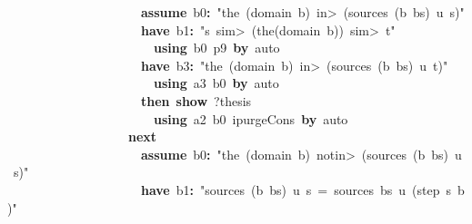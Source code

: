 \documentclass{article}
\newcommand{\syntaxKEYWORDA}[1]{\textcolor[rgb]{0.0,0.4,0.6}{\textbf{#1}}}
\newcommand{\syntaxKEYWORDC}[1]{\textcolor[rgb]{0.0,0.6,1.0}{\textbf{#1}}}
\newcommand{\syntaxLITERALA}[1]{\textcolor[rgb]{1.0,0.0,0.8}{#1}}
\newcommand{\syntaxOPERATOR}[1]{\textcolor[rgb]{0.0,0.0,0.0}{\textbf{#1}}}
\newcommand{\syntaxKEYWORDA}[1]{\textcolor[rgb]{0.0,0.4,0.6}{\textbf{#1}}}
\newcommand{\syntaxKEYWORDC}[1]{\textcolor[rgb]{0.0,0.6,1.0}{\textbf{#1}}}
\newcommand{\syntaxLITERALA}[1]{\textcolor[rgb]{1.0,0.0,0.8}{#1}}
\newcommand{\syntaxOPERATOR}[1]{\textcolor[rgb]{0.0,0.0,0.0}{\textbf{#1}}}
\newcommand{\syntaxKEYWORDA}[1]{\textcolor[rgb]{0.0,0.4,0.6}{\textbf{#1}}}
\newcommand{\syntaxKEYWORDC}[1]{\textcolor[rgb]{0.0,0.6,1.0}{\textbf{#1}}}
\newcommand{\syntaxLITERALA}[1]{\textcolor[rgb]{1.0,0.0,0.8}{#1}}
\newcommand{\syntaxOPERATOR}[1]{\textcolor[rgb]{0.0,0.0,0.0}{\textbf{#1}}}
\newcommand{\syntaxKEYWORDA}[1]{\textcolor[rgb]{0.0,0.4,0.6}{#1}}
\newcommand{\syntaxKEYWORDC}[1]{\textcolor[rgb]{0.0,0.6,1.0}{#1}}
\newcommand{\syntaxLITERALA}[1]{\textcolor[rgb]{1.0,0.0,0.8}{\textbf{#1}}}
\newcommand{\syntaxOPERATOR}[1]{\textcolor[rgb]{0.0,0.0,0.0}{#1}}
\newcommand{\syntaxKEYWORDA}[1]{\textcolor[rgb]{0.0,0.4,0.6}{\textbf{#1}}}
\newcommand{\syntaxKEYWORDC}[1]{\textcolor[rgb]{0.0,0.6,1.0}{\textbf{#1}}}
\newcommand{\syntaxLITERALA}[1]{\textcolor[rgb]{1.0,0.0,0.8}{#1}}
\newcommand{\syntaxOPERATOR}[1]{\textcolor[rgb]{0.0,0.0,0.0}{\textbf{#1}}}
\newcommand{\syntaxKEYWORDA}[1]{\textcolor[rgb]{0.0,0.4,0.6}{\textbf{#1}}}
\newcommand{\syntaxKEYWORDC}[1]{\textcolor[rgb]{0.0,0.6,1.0}{\textbf{#1}}}
\newcommand{\syntaxLITERALA}[1]{\textcolor[rgb]{1.0,0.0,0.8}{#1}}
\newcommand{\syntaxOPERATOR}[1]{\textcolor[rgb]{0.0,0.0,0.0}{\textbf{#1}}}
\begin{document}
{\ }{\ }{\ }{\ }{\ }{\ }{\ }{\ }{\ }{\ }{\ }{\ }{\ }{\ }{\ }{\ }{\ }{\ }{\ }{\ }{\ }\syntaxKEYWORDC{assume}{\ }b0\syntaxOPERATOR{:}{\ }\syntaxLITERALA{"the{\ }(domain{\ }b){\ }\<in>{\ }(sources{\ }(b{\ }\usebox{\hashbox}{\ }bs){\ }u{\ }s)"}\hspace*{\fill}\\
{\ }{\ }{\ }{\ }{\ }{\ }{\ }{\ }{\ }{\ }{\ }{\ }{\ }{\ }{\ }{\ }{\ }{\ }{\ }{\ }{\ }\syntaxKEYWORDA{have}{\ }b1\syntaxOPERATOR{:}{\ }\syntaxLITERALA{"s{\ }\<sim>{\ }(the(domain{\ }b)){\ }\<sim>{\ }t"}\hspace*{\fill}\\
{\ }{\ }{\ }{\ }{\ }{\ }{\ }{\ }{\ }{\ }{\ }{\ }{\ }{\ }{\ }{\ }{\ }{\ }{\ }{\ }{\ }{\ }{\ }\syntaxKEYWORDA{using}{\ }b0{\ }p9{\ }\syntaxKEYWORDA{by}{\ }auto\hspace*{\fill}\\
{\ }{\ }{\ }{\ }{\ }{\ }{\ }{\ }{\ }{\ }{\ }{\ }{\ }{\ }{\ }{\ }{\ }{\ }{\ }{\ }{\ }\syntaxKEYWORDA{have}{\ }b3\syntaxOPERATOR{:}{\ }\syntaxLITERALA{"the{\ }(domain{\ }b){\ }\<in>{\ }(sources{\ }(b{\ }\usebox{\hashbox}{\ }bs){\ }u{\ }t)"}\hspace*{\fill}\\
{\ }{\ }{\ }{\ }{\ }{\ }{\ }{\ }{\ }{\ }{\ }{\ }{\ }{\ }{\ }{\ }{\ }{\ }{\ }{\ }{\ }{\ }{\ }\syntaxKEYWORDA{using}{\ }a3{\ }b0{\ }\syntaxKEYWORDA{by}{\ }auto\hspace*{\fill}\\
{\ }{\ }{\ }{\ }{\ }{\ }{\ }{\ }{\ }{\ }{\ }{\ }{\ }{\ }{\ }{\ }{\ }{\ }{\ }{\ }{\ }\syntaxKEYWORDA{then}{\ }\syntaxKEYWORDC{show}{\ }?thesis\hspace*{\fill}\\
{\ }{\ }{\ }{\ }{\ }{\ }{\ }{\ }{\ }{\ }{\ }{\ }{\ }{\ }{\ }{\ }{\ }{\ }{\ }{\ }{\ }{\ }{\ }\syntaxKEYWORDA{using}{\ }a2{\ }b0{\ }ipurge\usebox{\underscorebox}Cons{\ }\syntaxKEYWORDA{by}{\ }auto\hspace*{\fill}\\
{\ }{\ }{\ }{\ }{\ }{\ }{\ }{\ }{\ }{\ }{\ }{\ }{\ }{\ }{\ }{\ }{\ }{\ }{\ }\syntaxKEYWORDA{next}\hspace*{\fill}\\
{\ }{\ }{\ }{\ }{\ }{\ }{\ }{\ }{\ }{\ }{\ }{\ }{\ }{\ }{\ }{\ }{\ }{\ }{\ }{\ }{\ }\syntaxKEYWORDC{assume}{\ }b0\syntaxOPERATOR{:}{\ }\syntaxLITERALA{"the{\ }(domain{\ }b){\ }\<notin>{\ }(sources{\ }(b{\ }\usebox{\hashbox}{\ }bs){\ }u{\ }s)"}\hspace*{\fill}\\
{\ }{\ }{\ }{\ }{\ }{\ }{\ }{\ }{\ }{\ }{\ }{\ }{\ }{\ }{\ }{\ }{\ }{\ }{\ }{\ }{\ }\syntaxKEYWORDA{have}{\ }b1\syntaxOPERATOR{:}{\ }\syntaxLITERALA{"sources{\ }(b{\ }\usebox{\hashbox}{\ }bs){\ }u{\ }s{\ }={\ }sources{\ }bs{\ }u{\ }(step{\ }s{\ }b)"}\hspace*{\fill}\\
\end{document}
